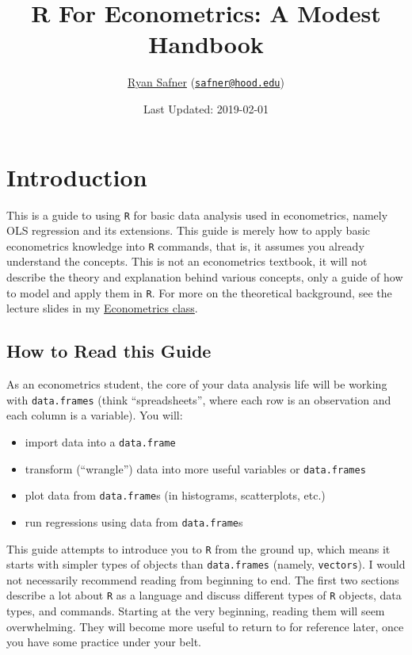 \documentclass[]{book}
\title{R For Econometrics: A Modest Handbook}
\author{\href{http://ryansafner.com}{Ryan Safner}
(\href{mailto:safner@hood.edu}{\nolinkurl{safner@hood.edu}})}
\date{Last Updated: 2019-02-01}
\providecommand{\tightlist}{%
  \setlength{\itemsep}{0pt}\setlength{\parskip}{0pt}}
\theoremstyle{definition}
\theoremstyle{definition}
\theoremstyle{definition}
\theoremstyle{remark}
\begin{document}
\maketitle

{
\setcounter{tocdepth}{1}
\tableofcontents
}
\chapter*{Introduction}\label{introduction}

This is a guide to using \texttt{R} for basic data analysis used in
econometrics, namely OLS regression and its extensions. This guide is
merely how to apply basic econometrics knowledge into \texttt{R}
commands, that is, it assumes you already understand the concepts. This
is not an econometrics textbook, it will not describe the theory and
explanation behind various concepts, only a guide of how to model and
apply them in \texttt{R}. For more on the theoretical background, see
the lecture slides in my
\href{http://ryansafner.com/courses/econ480}{Econometrics class}.

\section*{How to Read this Guide}\label{how-to-read-this-guide}

As an econometrics student, the core of your data analysis life will be
working with \texttt{data.frames} (think ``spreadsheets'', where each
row is an observation and each column is a variable). You will:

\begin{itemize}
\tightlist
\item
  import data into a \texttt{data.frame}
\item
  transform (``wrangle'') data into more useful variables or
  \texttt{data.frames}
\item
  plot data from \texttt{data.frame}s (in histograms, scatterplots,
  etc.)
\item
  run regressions using data from \texttt{data.frame}s
\end{itemize}

This guide attempts to introduce you to \texttt{R} from the ground up,
which means it starts with simpler types of objects than
\texttt{data.frames} (namely, \texttt{vectors}). I would not necessarily
recommend reading from beginning to end. The first two sections describe
a lot about \texttt{R} as a language and discuss different types of
\texttt{R} objects, data types, and commands. Starting at the very
beginning, reading them will seem overwhelming. They will become more
useful to return to for reference later, once you have some practice
under your belt.
\end{document}
